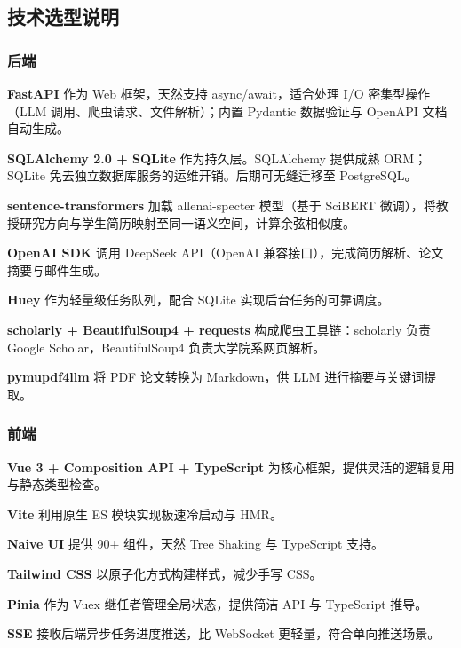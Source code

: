 \documentclass[11pt]{article}
\begin{document}
\subsection{技术选型说明}

\subsubsection{后端}

\textbf{FastAPI} 作为 Web 框架，天然支持 async/await，适合处理 I/O 密集型操作（LLM 调用、爬虫请求、文件解析）；内置 Pydantic 数据验证与 OpenAPI 文档自动生成。

\textbf{SQLAlchemy 2.0 + SQLite} 作为持久层。SQLAlchemy 提供成熟 ORM；SQLite 免去独立数据库服务的运维开销。后期可无缝迁移至 PostgreSQL。

\textbf{sentence-transformers} 加载 allenai-specter 模型（基于 SciBERT 微调），将教授研究方向与学生简历映射至同一语义空间，计算余弦相似度。

\textbf{OpenAI SDK} 调用 DeepSeek API（OpenAI 兼容接口），完成简历解析、论文摘要与邮件生成。

\textbf{Huey} 作为轻量级任务队列，配合 SQLite 实现后台任务的可靠调度。

\textbf{scholarly + BeautifulSoup4 + requests} 构成爬虫工具链：scholarly 负责 Google Scholar，BeautifulSoup4 负责大学院系网页解析。

\textbf{pymupdf4llm} 将 PDF 论文转换为 Markdown，供 LLM 进行摘要与关键词提取。

\subsubsection{前端}

\textbf{Vue 3 + Composition API + TypeScript} 为核心框架，提供灵活的逻辑复用与静态类型检查。

\textbf{Vite} 利用原生 ES 模块实现极速冷启动与 HMR。

\textbf{Naive UI} 提供 90+ 组件，天然 Tree Shaking 与 TypeScript 支持。

\textbf{Tailwind CSS} 以原子化方式构建样式，减少手写 CSS。

\textbf{Pinia} 作为 Vuex 继任者管理全局状态，提供简洁 API 与 TypeScript 推导。

\textbf{SSE} 接收后端异步任务进度推送，比 WebSocket 更轻量，符合单向推送场景。

\end{document}
